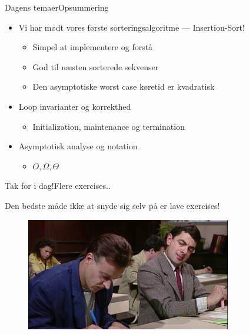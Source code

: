 \documentclass[aspectratio=1610]{beamer}
\begin{document}
\begin{frame}{Dagens temaer}{Opsummering}
    \begin{itemize}
        \item Vi har mødt vores første sorteringsalgoritme --- Insertion-Sort!
            \begin{itemize}
                \item Simpel at implementere og forstå
                \item God til næsten sorterede sekvenser
                \item Den asymptotiske worst case køretid er kvadratisk
            \end{itemize}
        \item Loop invarianter og korrekthed
            \begin{itemize}
                \item Initialization, maintenance og termination
            \end{itemize}
        \item Asymptotisk analyse og notation
            \begin{itemize}
                \item $O, \Omega, \Theta$
            \end{itemize}
    \end{itemize}
\end{frame}


\begin{frame}{Tak for i dag!}{Flere exercises..}

    Den bedste måde ikke at snyde sig selv på er lave exercises!

    \begin{figure}[h]
        \centering
        \includegraphics[width=0.8\textwidth]{exercises}
    \end{figure}
    
\end{frame}
\end{document}
